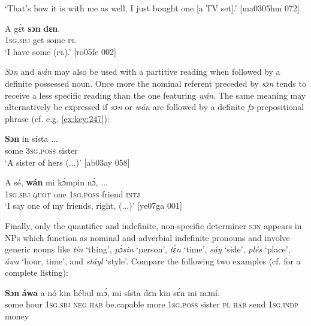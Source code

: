 \glt ‘That’s how it is with me as well, I just bought one [a TV set].’ [ma0305hm 072]
\z


\ea%
    \label{ex:key:187}
    \gll A    gɛ́t  \textbf{sɔn}    \textbf{dɛn}.\\
\textsc{1sg.sbj}  get  some  \textsc{pl}\\

\glt ‘I have some (\textsc{pl}).’ [ro05fe 002]
\z

\textit{Sɔn} and \textit{wán} may also be used with a partitive reading when followed by a definite possessed noun. Once more the nominal referent preceded by \textit{sɔn} tends to receive a less specific reading than the one featuring \textit{wán}. The same meaning may alternatively be expressed if \textit{sɔn} or \textit{wán} are followed by a definite \textit{fɔ}-prepositional phrase (cf. e.g. \ref{ex:key:247}):


\ea%
    \label{ex:key:188}
    \gll \textbf{Sɔn}   in    sísta    \op...\cp\\
some  \textsc{3sg.poss}  sister\\

\glt ‘A sister of hers (...)’ [ab03ay 058]
\z


\ea%
    \label{ex:key:189}
    \gll A    sé,    \textbf{wán}    mi    kɔ́mpin  nɔ́,  \op...\cp\\
\textsc{1sg.sbj}  \textsc{quot}    one    \textsc{1sg.poss}  friend  \textsc{intj}  \\

\glt ‘I say one of my friends, right, (...)’ [ye07ga 001]
\z

Finally, only the quantifier and indefinite, non-specific determiner \textsc{sɔn} appears in NPs which function as nominal and adverbial indefinite pronouns and involve generic noun{\fff}s like \textit{tín} ‘thing’, \textit{pɔ́sin} ‘person’, \textit{tɛ́n} ‘time’, \textit{sáy} ‘side’, \textit{plés} ‘place’, \textit{áwa} ‘hour, time’, and \textit{stáyl} ‘style’. Compare the following two examples (cf.  for a complete listing):{\fff}


\ea%
    \label{ex:key:190}
    \gll \textbf{Sɔn} \textbf{   áwa}    a    nó  kin  hébul    mɔ́,    mi
sísta    dɛn  kin  sɛ́n    mi    mɔní.\\
some  hour  \textsc{1sg.sbj}  \textsc{neg}  \textsc{hab}  be.capable  more  \textsc{1sg.poss}
sister  \textsc{pl}  \textsc{hab}  send  \textsc{1sg.indp}  money\\

